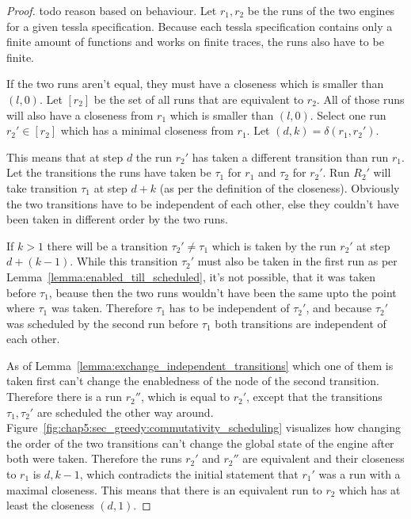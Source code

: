 \begin{proof}

  todo reason based on behaviour.
  Let \(r_1, r_2\) be the runs of the two engines for a given \gls{tessla} specification.
  Because each \gls{tessla} specification contains only a finite amount of functions and works on finite traces, the runs also have to be finite.

  If the two runs aren't equal, they must have a closeness which is smaller than \((l, 0)\).
  Let \([r_2]\) be the set of all runs that are equivalent to \(r_2\).
  All of those runs will also have a closeness from \(r_1\) which is smaller than \((l, 0)\).
  Select one run \(r_2' \in [r_2]\) which has a minimal closeness from \(r_1\).
  Let \((d,k) = \delta(r_1, r_2')\).

  This means that at step \(d\) the run \(r_2'\) has taken a different transition than run \(r_1\).
  Let the transitions the runs have taken be \(\tau_1\) for \(r_1\) and \(\tau_2\) for \(r_2'\).
  Run \(R_2'\) will take transition \(\tau_1\) at step \(d+k\) (as per the definition of the closeness).
  Obviously the two transitions have to be independent of each other, else they couldn't have been taken in different order by the two runs.

  If \(k > 1\) there will be a transition \(\tau_2' \neq \tau_1\) which is taken by the run \(r_2'\) at step \(d+(k-1)\).
  While this transition \(\tau_2'\) must also be taken in the first run as per Lemma~\ref{lemma:enabled_till_scheduled}, it's not possible, that it was taken before \(\tau_1\), beause then the two runs wouldn't have been the same upto the point where \(\tau_1\) was taken.
  Therefore \(\tau_1\) has to be independent of \(\tau_2'\), and because \(\tau_2'\) was scheduled by the second run before \(\tau_1\) both transitions are independent of each other.

  As of Lemma~\ref{lemma:exchange_independent_transitions} which one of them is taken first can't change the enabledness of the node of the second transition.
  Therefore there is a run \(r_2''\), which is equal to \(r_2'\), except that the transitions \(\tau_1, \tau_2'\) are scheduled the other way around.
  Figure~\ref{fig:chap5:sec_greedy:commutativity_scheduling} visualizes how changing the order of the two transitions can't change the global state of the engine after both were taken.
  Therefore the runs \(r_2'\) and \(r_2''\) are equivalent and their closeness to \(r_1\) is \(d, k-1\), which contradicts the initial statement that \(r_1'\) was a run with a maximal closeness.
  This means that there is an equivalent run to \(r_2\) which has at least the closeness \((d, 1)\).


\end{proof}
